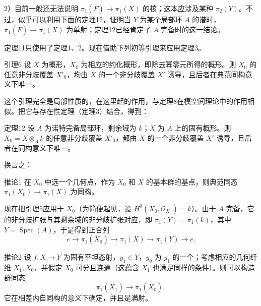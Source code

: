 2）目前一般还无法说明 $\pi_1(\overline F)\to\pi_1(X)$ 的核；这本应涉及某种 $\pi_2(Y)$。不过，似乎可以利用下面的定理12，证明当 $Y$ 为某个局部环 $A$ 的谱时，$\pi_1(\overline F)\to\pi_1(X)$ 为单射；定理12已经肯定了 $A$ 完备时的这一结论。

定理11只使用了定理1、2。现在借助下列初等引理来应用定理3。
\begin{statement}{引理6}
设 $X$ 为概形，$X_0$ 为相应的约化概形，即除去幂零元所得的概形。则 $X_0$ 的任意非分歧覆盖 $X'_0$，均由 $X$ 的一个非分歧覆盖 $X'$ 诱导，且后者在典范同构意义下唯一。
\end{statement}
这个引理完全是局部性质的，在这里起的作用，与定理8在模空间理论中的作用相似。把它与存在性定理（定理3）结合，得到：
\begin{statement}{定理12}
设 $A$ 为诺特完备局部环，剩余域为 $k$；$X$ 为 $A$ 上的固有概形。则 $X_0=X\otimes_Ak$ 的任意非分歧覆盖 $X'_0$，都由 $X$ 的一个非分歧覆盖 $X'$ 诱导，且后者在同构意义下唯一。
\end{statement}
换言之：
\begin{statement}{推论1}
在 $X_0$ 中选一个几何点，作为 $X_0$ 和 $X$ 的基本群的基点，则典范同态 $\pi_1(X_0)\to\pi_1(X)$ 为同构。
\end{statement}
现在把引理5应用于 $X_0$（为简便起见，设 $H^0(X_0,\mathcal O_{X_0})=k$）。由于 $A$ 完备，它的非分歧扩张与其剩余域的非分歧扩张对应，即 $\pi_1(Y)=\pi_1(k)$，其中 $Y=\operatorname{Spec}(A)$，于是得到正合列
\[
e\longrightarrow\pi_1(\overline X_0)\longrightarrow\pi_1(X)
\longrightarrow\pi_1(Y)\longrightarrow e.
\]
\begin{statement}{推论2}
设 $f:X\to Y$ 为固有平坦态射，$y_1\in Y$，$y_0$ 为 $y_1$ 的一个；考虑相应的几何纤维 $\overline X_1,\overline X_0$，并假定 $\overline X_0$ 可分且连通（这蕴含 $\overline X_1$ 也满足同样的条件）。则可以构造群同态
\[
\pi_1(\overline X_1)\longrightarrow\pi_1(\overline X_0),
\]
它在相差内自同构的意义下确定，并且是满射。
\end{statement}

